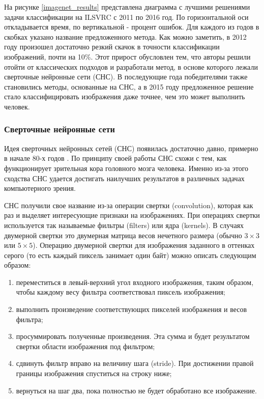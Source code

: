 На рисунке \ref{imagenet_results} представлена диаграмма с лучшими решениями задачи классификации на ILSVRC с 2011 
по 2016 год. По горизонтальной оси откладывается время, по вертикальной - процент ошибок. Для каждого из годов в скобках
указано название предложенного метода. Как можно заметить, в 2012 году произошел достаточно резкий скачок в точности 
классификации изображений, почти на 10\%. Этот прирост обусловлен тем, что авторы решили отойти от классических подходов 
и разработали метод, в основе которого лежали сверточные нейронные сети (СНС). В последующие года победителями также 
становились методы, основанные на СНС, а в 2015 году предложенное решение стало классифицировать изображения даже 
точнее, чем это может выполнить человек.


\subsubsection{Сверточные нейронные сети}
Идея сверточных нейронных сетей (СНС) появилась достаточно давно, примерно в начале 80-х годов \cite{DIVE_INTO_DL}.
По принципу своей работы СНС схожи с тем, как функционирует зрительная кора головного мозга человека. Именно из-за этого
сходства СНС удается достигать наилучших результатов в различных задачах компьютерного зрения.

СНС получили свое название из-за операции свертки (convolution), которая как раз и выделяет интересующие признаки
на изображениях. При операциях свертки используется так называемые фильтры (filters) или ядра (kernels). В случаях 
двумерной свертки это двумерная матрица весов нечетного размера (обычно $3 \times 3$ или $5 \times 5$). Операцию 
двумерной свертки для изображения заданного в оттенках серого (то есть каждый пиксель занимает один байт) 
можно описать следующим образом:

\begin{enumerate}
\item переместиться в левый-верхний угол входного изображения, таким образом, чтобы каждому весу фильтра соответствовал
пиксель изображения;
\item выполнить произведение соответствующих пикселей изображения и весов фильтра;
\item просуммировать полученные произведения. Эта сумма и будет результатом свертки области изображения под фильтром;
\item сдвинуть фильтр вправо на величину шага (stride). При достижении правой границы изображения спуститься
на строку ниже;
\item вернуться на шаг два, пока полностью не будет обработано все изображение.
\end{enumerate}


